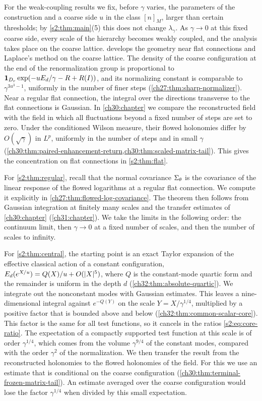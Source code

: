 For the weak-coupling results we fix, before $\gamma$ varies, the parameters of the construction and a coarse side $u$ in the class $[n]_M$, larger than certain thresholds; by \cref{s2:thm:main}(5) this does not change $\lambda_\gamma$. As $\gamma\to0$ at this fixed coarse side, every scale of the hierarchy becomes weakly coupled, and the analysis takes place on the coarse lattice.  develops the geometry near flat connections and Laplace's method on the coarse lattice. The density of the coarse configuration at the end of the renormalization group is proportional to $\mathbf 1_{D_r}\exp(-uE_d/\gamma-R+R(I))$, and its normalizing constant is comparable to $\gamma^{3u^3-1}$, uniformly in the number of finer steps (\cref{ch27:thm:sharp-normalizer}). Near a regular flat connection, the integral over the directions transverse to the flat connections is Gaussian. In \cref{ch30:chapter} we compare the reconstructed field with the field in which all fluctuations beyond a fixed number of steps are set to zero. Under the conditioned Wilson measure, their flowed holonomies differ by $O(\sqrt\gamma)$ in $L^p$, uniformly in the number of steps and in small $\gamma$ (\cref{ch30:thm:paired-enhancement-return,ch30:thm:scaled-matrix-tail}). This gives the concentration on flat connections in \cref{s2:thm:flat}.

For \cref{s2:thm:regular}, recall that the normal covariance $\Sigma_\theta$ is the covariance of the linear response of the flowed logarithms at a regular flat connection. We compute it explicitly in \cref{ch27:thm:flowed-log-covariance}. The theorem then follows from Gaussian integration at finitely many scales and the transfer estimates of \cref{ch30:chapter} (\cref{ch31:chapter}). We take the limits in the following order: the continuum limit, then $\gamma\to0$ at a fixed number of scales, and then the number of scales to infinity.

For \cref{s2:thm:central}, the starting point is an exact Taylor expansion of the effective classical action of a constant configuration, $E_d(e^{X/u})=Q(X)/u+O(\lvert X\rvert^5)$, where $Q$ is the constant-mode quartic form and the remainder is uniform in the depth $d$ (\cref{ch32:thm:absolute-quartic}). We integrate out the nonconstant modes with Gaussian estimates. This leaves a nine-dimensional integral against $e^{-Q(Y)}$ on the scale $Y=X/\gamma^{1/4}$, multiplied by a positive factor that is bounded above and below (\cref{ch32:thm:common-scalar-core}). This factor is the same for all test functions, so it cancels in the ratios \eqref{s2:eq:core-ratio}. The expectation of a compactly supported test function at this scale is of order $\gamma^{1/4}$, which comes from the volume $\gamma^{9/4}$ of the constant modes, compared with the order $\gamma^2$ of the normalization. We then transfer the result from the reconstructed holonomies to the flowed holonomies of the field. For this we use an estimate that is conditional on the coarse configuration (\cref{ch30:thm:terminal-frozen-matrix-tail}). An estimate averaged over the coarse configuration would lose the factor $\gamma^{1/4}$ when divided by this small expectation.

